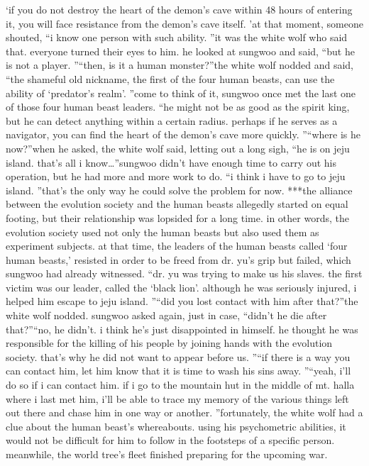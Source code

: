 ‘if you do not destroy the heart of the demon’s cave within 48 hours of entering it, you will face resistance from the demon’s cave itself.
’at that moment, someone shouted, “i know one person with such ability.
”it was the white wolf who said that.
 everyone turned their eyes to him.
he looked at sungwoo and said, “but he is not a player.
”“then, is it a human monster?”the white wolf nodded and said, “the shameful old nickname, the first of the four human beasts, can use the ability of ‘predator’s realm’.
”come to think of it, sungwoo once met the last one of those four human beast leaders.
“he might not be as good as the spirit king, but he can detect anything within a certain radius.
 perhaps if he serves as a navigator, you can find the heart of the demon’s cave more quickly.
”“where is he now?”when he asked, the white wolf said, letting out a long sigh, “he is on jeju island.
 that’s all i know…”sungwoo didn’t have enough time to carry out his operation, but he had more and more work to do.
“i think i have to go to jeju island.
”that’s the only way he could solve the problem for now.
***the alliance between the evolution society and the human beasts allegedly started on equal footing, but their relationship was lopsided for a long time.
 in other words, the evolution society used not only the human beasts but also used them as experiment subjects.
at that time, the leaders of the human beasts called ‘four human beasts,’ resisted in order to be freed from dr.
 yu’s grip but failed, which sungwoo had already witnessed.
“dr.
 yu was trying to make us his slaves.
 the first victim was our leader, called the ‘black lion’.
 although he was seriously injured, i helped him escape to jeju island.
”“did you lost contact with him after that?”the white wolf nodded.
sungwoo asked again, just in case, “didn’t he die after that?”“no, he didn’t.
 i think he’s just disappointed in himself.
 he thought he was responsible for the killing of his people by joining hands with the evolution society.
 that’s why he did not want to appear before us.
”“if there is a way you can contact him, let him know that it is time to wash his sins away.
”“yeah, i’ll do so if i can contact him.
 if i go to the mountain hut in the middle of mt.
 halla where i last met him, i’ll be able to trace my memory of the various things left out there and chase him in one way or another.
”fortunately, the white wolf had a clue about the human beast’s whereabouts.
using his psychometric abilities, it would not be difficult for him to follow in the footsteps of a specific person.
meanwhile, the world tree’s fleet finished preparing for the upcoming war.


